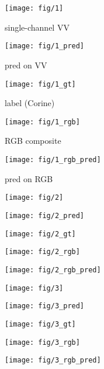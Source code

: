 \documentclass[a4paper]{article}
\begin{document}
\begin{figure}
    \centering %
\begin{subfigure}{0.19\textwidth}  \caption{single-channel VV}
  \label{fig:1}
  \texttt{[image: fig/1]}
\end{subfigure}\hfil %
\begin{subfigure}{0.19\textwidth}  \caption{pred on VV}
  \label{fig:2}
  \texttt{[image: fig/1\_pred]}
\end{subfigure}\hfil %
\begin{subfigure}{0.19\textwidth}
  \caption{label (Corine)}
  \label{fig:3}
  \texttt{[image: fig/1\_gt]}
\end{subfigure}
\begin{subfigure}{0.19\textwidth}  \caption{RGB composite}
  \label{fig:4}
  \texttt{[image: fig/1\_rgb]}
\end{subfigure}\hfil %
\begin{subfigure}{0.19\textwidth}
  \caption{pred on RGB}
  \label{fig:5}
  \texttt{[image: fig/1\_rgb\_pred]}
\end{subfigure}

\medskip
\begin{subfigure}{0.19\textwidth}
  \texttt{[image: fig/2]}
\end{subfigure}\hfil %
\begin{subfigure}{0.19\textwidth}
  \texttt{[image: fig/2\_pred]}
\end{subfigure}\hfil %
\begin{subfigure}{0.19\textwidth}
  \texttt{[image: fig/2\_gt]}
\end{subfigure}
\begin{subfigure}{0.19\textwidth}
  \texttt{[image: fig/2\_rgb]}
\end{subfigure}\hfil %
\begin{subfigure}{0.19\textwidth}
  \texttt{[image: fig/2\_rgb\_pred]}
\end{subfigure}

\medskip
\begin{subfigure}{0.19\textwidth}
  \texttt{[image: fig/3]}
\end{subfigure}\hfil %
\begin{subfigure}{0.19\textwidth}
  \texttt{[image: fig/3\_pred]}
\end{subfigure}\hfil %
\begin{subfigure}{0.19\textwidth}
  \texttt{[image: fig/3\_gt]}
\end{subfigure}
\begin{subfigure}{0.19\textwidth}
  \texttt{[image: fig/3\_rgb]}
\end{subfigure}\hfil %
\begin{subfigure}{0.19\textwidth}
  \texttt{[image: fig/3\_rgb\_pred]}
\end{subfigure}


\end{figure}
\end{document}
